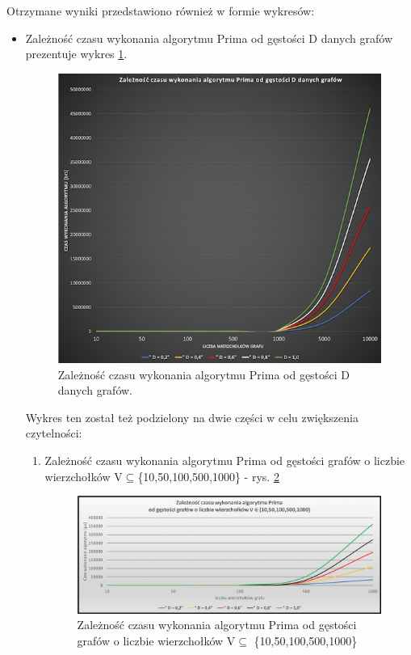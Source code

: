 \newpage
Otrzymane wyniki przedstawiono również w formie wykresów:
\begin{itemize}
 \item Zależność czasu wykonania algorytmu Prima od gęstości D danych grafów prezentuje wykres \ref{fig: w1}. 
 
 \begin{figure}[htb!]
 	\centering
 	\includegraphics[width=1 \textwidth]{tex/fig/p1}
 	\caption{Zależność czasu wykonania algorytmu Prima od gęstości D danych grafów.}
 	\label{fig: w1}
 \end{figure}

\newpage
 Wykres ten został też podzielony na dwie części w celu zwiększenia czytelności:
 \begin{enumerate}
 	\item Zależność czasu wykonania algorytmu Prima od gęstości grafów o liczbie wierzchołków V$\subseteq$\{10,50,100,500,1000\} - rys. \ref{fig: ww1}
 	
 	 \begin{figure}[htb!]
 		\centering
 		\includegraphics[width=1\textwidth]{tex/fig/p2_10_1000}
 		\caption{Zależność czasu wykonania algorytmu Prima od gęstości grafów o liczbie wierzchołków V$\subseteq$ \{10,50,100,500,1000\}}
 		\label{fig: ww1}
 	\end{figure}
 

\end{enumerate}
\end{itemize}
